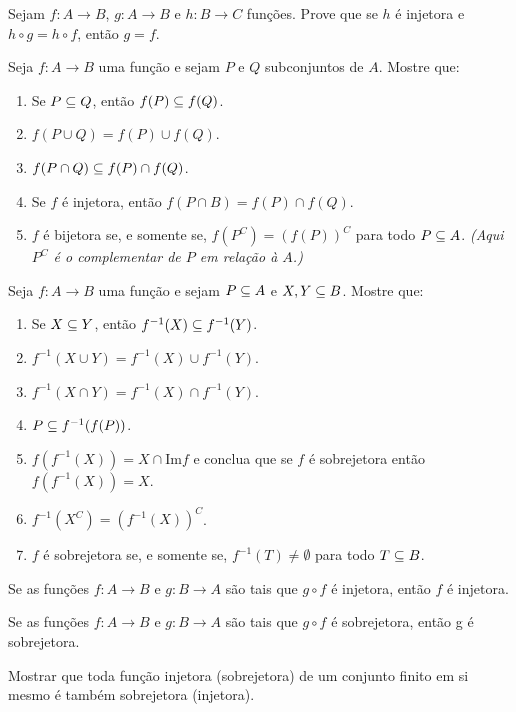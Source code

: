\documentclass[12pt]{exam}
\begin{document}
\vspace{.3cm}

\questao Sejam $f : A \to B$, $g : A \to B$ e $h : B \to C$ fun\c{c}\~oes. Prove que se $h$ \'e injetora e $h \circ g = h \circ f$, ent\~ao $g = f$.

\vspace{.3cm}

\questao Seja $f : A \to B$ uma fun\c{c}\~ao e sejam $P$ e $Q$ subconjuntos de $A$. Mostre que:
\begin{enumerate}[label={\alph*})]
	\item Se $P\subseteq Q$, ent{\~a}o $f(P)\subseteq f(Q)$.
	\item $f(P\cup Q) = f(P)\cup f(Q)$.
	\item $f(P\cap Q)\subseteq f(P)\cap f(Q)$.
	\item Se $f$ {\'e} injetora, ent{\~a}o $f(P\cap B) =  f(P)\cap f(Q)$.
	\item $f$ {\'e} bijetora se, e somente se, $f(P^C) = (f(P))^C$ para todo $P \subseteq A$. \textit{(Aqui $P^C$ \'e o complementar de $P$ em rela\c{c}\~ao \`a $A$.)}
\end{enumerate}

\vspace{.3cm}

\questao Seja $f : A \to B$ uma fun{\c c}{\~a}o e sejam $P \subseteq
A$ e $X, Y\subseteq B$. Mostre que:
\begin{enumerate}[label={\alph*})]
	\item Se $X\subseteq Y$, ent{\~a}o $f^{-1}(X)\subseteq f^{-1}(Y)$.
	\item $f^{-1}(X\cup Y)=f^{-1}(X)\cup f^{-1}(Y)$.
	\item $f^{-1}(X\cap Y)= f^{-1}(X)\cap f^{-1}(Y)$.
	\item $P\subseteq f^{-1}(f(P))$.
	\item $f(f^{-1}(X))= X \cap \mbox{Im}f$ e conclua que se $f$ {\'e} sobrejetora ent{\~a}o
	$f(f^{-1}(X))=X$.
	\item $f^{-1}(X^C) = (f^{-1}(X))^C$.
	\item $f$ \'e sobrejetora se, e somente se, $f^{-1}(T) \ne \emptyset$ para todo $T \subseteq B$.
\end{enumerate}

\vspace{.3cm}

\questao Se as fun{\c c}{\~o}es $f : A \to B$ e $g : B\to A$ s{\~a}o
tais que $g\circ f$ {\'e} injetora, ent{\~a}o $f$ {\'e} injetora.

\vspace{.3cm}

\questao Se as fun{\c c}{\~o}es $f : A \to B$ e $g : B\to A$ s{\~a}o
tais que $g\circ f$ {\'e} sobrejetora, ent{\~a}o g {\'e} sobrejetora.

\vspace{.3cm}

\questao Mostrar que toda fun{\c c}{\~a}o injetora (sobrejetora) de um conjunto finito em si mesmo {\'e} tamb{\'e}m sobrejetora (injetora).
\end{document}
